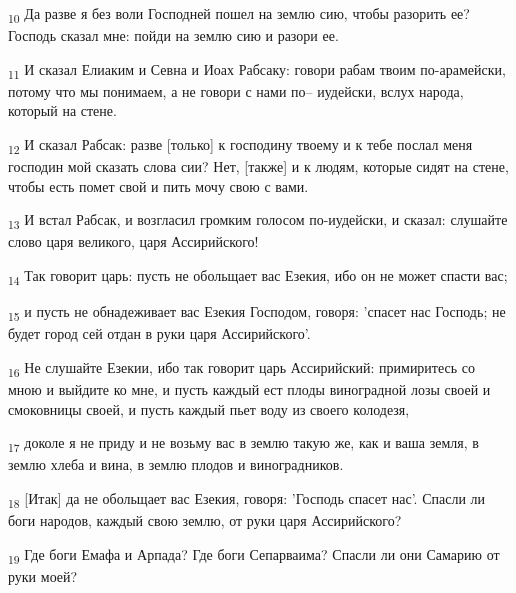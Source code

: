 \begin{tcolorbox}
\textsubscript{10} Да разве я без воли Господней пошел на землю сию, чтобы разорить ее? Господь сказал мне: пойди на землю сию и разори ее.
\end{tcolorbox}
\begin{tcolorbox}
\textsubscript{11} И сказал Елиаким и Севна и Иоах Рабсаку: говори рабам твоим по-арамейски, потому что мы понимаем, а не говори с нами по-- иудейски, вслух народа, который на стене.
\end{tcolorbox}
\begin{tcolorbox}
\textsubscript{12} И сказал Рабсак: разве [только] к господину твоему и к тебе послал меня господин мой сказать слова сии? Нет, [также] и к людям, которые сидят на стене, чтобы есть помет свой и пить мочу свою с вами.
\end{tcolorbox}
\begin{tcolorbox}
\textsubscript{13} И встал Рабсак, и возгласил громким голосом по-иудейски, и сказал: слушайте слово царя великого, царя Ассирийского!
\end{tcolorbox}
\begin{tcolorbox}
\textsubscript{14} Так говорит царь: пусть не обольщает вас Езекия, ибо он не может спасти вас;
\end{tcolorbox}
\begin{tcolorbox}
\textsubscript{15} и пусть не обнадеживает вас Езекия Господом, говоря: 'спасет нас Господь; не будет город сей отдан в руки царя Ассирийского'.
\end{tcolorbox}
\begin{tcolorbox}
\textsubscript{16} Не слушайте Езекии, ибо так говорит царь Ассирийский: примиритесь со мною и выйдите ко мне, и пусть каждый ест плоды виноградной лозы своей и смоковницы своей, и пусть каждый пьет воду из своего колодезя,
\end{tcolorbox}
\begin{tcolorbox}
\textsubscript{17} доколе я не приду и не возьму вас в землю такую же, как и ваша земля, в землю хлеба и вина, в землю плодов и виноградников.
\end{tcolorbox}
\begin{tcolorbox}
\textsubscript{18} [Итак] да не обольщает вас Езекия, говоря: 'Господь спасет нас'. Спасли ли боги народов, каждый свою землю, от руки царя Ассирийского?
\end{tcolorbox}
\begin{tcolorbox}
\textsubscript{19} Где боги Емафа и Арпада? Где боги Сепарваима? Спасли ли они Самарию от руки моей?
\end{tcolorbox}
